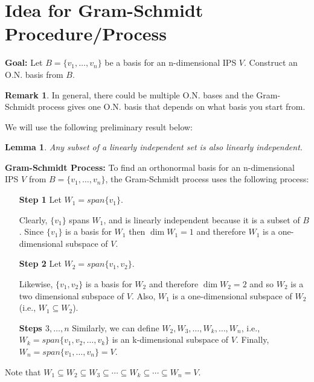 \documentclass[12pt]{article}
\newtheorem*{lemma}{Lemma}
\theoremstyle{definition}
\newtheorem*{remark}{Remark}
\begin{document}
\section{Idea for Gram-Schmidt Procedure/Process}

\textbf{Goal:} Let $B = \{ v_1, \ldots, v_n \}$ be a basis for an n-dimensional IPS $V$.
Construct an O.N. basis from $B$.

\begin{remark}
In general, there could be multiple O.N. bases and the Gram-Schmidt process gives one
O.N. basis that depends on what basis you start from.
\end{remark}

We will use the following preliminary result below:

\begin{lemma}
Any subset of a linearly independent set is also linearly independent.
\end{lemma}

\noindent \textbf{Gram-Schmidt Process:} To find an orthonormal basis for an n-dimensional 
IPS $V$ from $B = \{ v_1, \ldots, v_n \}$, the Gram-Schmidt process uses the following process:

\begin{itemize}
\item [\textbf{Step 1}] Let $W_1 = span\{v_1\}$.

Clearly, $\{v_1\}$ spans $W_1$, and is linearly independent because it is a subset
of $B$. Since $\{ v_1 \}$ is a basis for $W_1$ then $\dim W_1 = 1$ and therefore
$W_1$ is a one-dimensional subspace of $V$.

\item [\textbf{Step 2}] Let $W_2 = span\{v_1, v_2 \}$.

Likewise, $\{v_1, v_2\}$ is a basis for $W_2$ and therefore $\dim W_2 = 2$ and so
$W_2$ is a two dimensional subspace of $V$. Also, $W_1$ is a one-dimensional
subspace of $W_2$ (i.e., $W_1 \subseteq W_2$).

\item [\textbf{Steps $3, \ldots, n$}] Similarly, we can define $W_2, W_3,
\ldots, W_k, \ldots, W_n$, i.e., $W_k = span\{v_1, v_2, \ldots, v_k\}$ is an
k-dimensional subspace of $V$. Finally, $W_n = span\{v_1, \ldots, v_n\} = V$.

\end{itemize}

Note that $W_1 \subseteq W_2 \subseteq W_3 \subseteq \cdots \subseteq W_k \subseteq \cdots
\subseteq W_n = V$.
\end{document}

